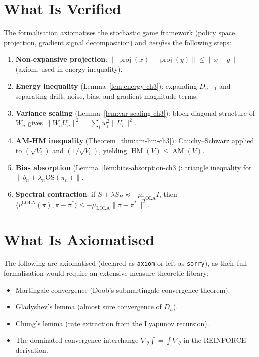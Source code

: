 \documentclass[a4paper,oneside,11pt]{report}
\begin{document}
\section{What Is Verified}

The formalisation axiomatises the stochastic game framework (policy space, projection, gradient signal decomposition) and \emph{verifies} the following steps:

\begin{enumerate}
    \item \textbf{Non-expansive projection}: $\|\operatorname{proj}(x) - \operatorname{proj}(y)\| \leq \|x - y\|$ (axiom, used in energy inequality).
    \item \textbf{Energy inequality} (Lemma~\ref{lem:energy-ch3}): expanding $D_{n+1}$ and separating drift, noise, bias, and gradient magnitude terms.
    \item \textbf{Variance scaling} (Lemma~\ref{lem:var-scaling-ch3}): block-diagonal structure of $W_n$ gives $\|W_n U_n\|^2 = \sum_i w_i^2 \|U_i\|^2$.
    \item \textbf{AM-HM inequality} (Theorem~\ref{thm:am-hm-ch3}): Cauchy--Schwarz applied to $(\sqrt{V_i})$ and $(1/\sqrt{V_i})$, yielding $\operatorname{HM}(V) \leq \operatorname{AM}(V)$.
    \item \textbf{Bias absorption} (Lemma~\ref{lem:bias-absorption-ch3}): triangle inequality for $\|b_n + \lambda_n \mathrm{OS}(\pi_n)\|$.
    \item \textbf{Spectral contraction}: if $S + \lambda S_H \preceq -\mu_{\mathrm{LOLA}} I$, then $\langle v^{\mathrm{LOLA}}(\pi), \pi - \pi^* \rangle \leq -\mu_{\mathrm{LOLA}} \|\pi - \pi^*\|^2$.
\end{enumerate}

\section{What Is Axiomatised}

The following are axiomatised (declared as \texttt{axiom} or left as \texttt{sorry}), as their full formalisation would require an extensive measure-theoretic library:
\begin{itemize}
    \item Martingale convergence (Doob's submartingale convergence theorem).
    \item Gladyshev's lemma (almost sure convergence of $D_n$).
    \item Chung's lemma (rate extraction from the Lyapunov recursion).
    \item The dominated convergence interchange $\nabla_\theta \int = \int \nabla_\theta$ in the REINFORCE derivation.
\end{itemize}
\end{document}
